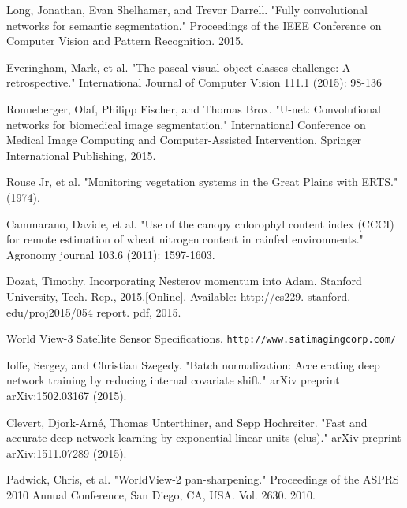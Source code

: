 \documentclass[10pt,twocolumn,letterpaper]{article}
\begin{document}
\begin{thebibliography}{10}
	
	 Long, Jonathan, Evan Shelhamer, and Trevor Darrell. "Fully convolutional networks for semantic segmentation." Proceedings of the IEEE Conference on Computer Vision and Pattern Recognition. 2015.
	
	 Everingham, Mark, et al. "The pascal visual object classes challenge: A retrospective." International Journal of Computer Vision 111.1 (2015): 98-136
	
	
	 Ronneberger, Olaf, Philipp Fischer, and Thomas Brox. "U-net: Convolutional networks for biomedical image segmentation." International Conference on Medical Image Computing and Computer-Assisted Intervention. Springer International Publishing, 2015.
	
	 Rouse Jr, et al. "Monitoring vegetation systems in the Great Plains with ERTS." (1974).
	
	 Cammarano, Davide, et al. "Use of the canopy chlorophyl content index (CCCI) for remote estimation of wheat nitrogen content in rainfed environments." Agronomy journal 103.6 (2011): 1597-1603.
		
	 Dozat, Timothy. Incorporating Nesterov momentum into Adam. Stanford University, Tech. Rep., 2015.[Online]. Available: http://cs229. stanford. edu/proj2015/054 report. pdf, 2015.
	
	 World View-3 Satellite Sensor Specifications.  \texttt{http://www.satimagingcorp.com/}
	
	 Ioffe, Sergey, and Christian Szegedy. "Batch normalization: Accelerating deep network training by reducing internal covariate shift." arXiv preprint arXiv:1502.03167 (2015).
	
	 Clevert, Djork-Arné, Thomas Unterthiner, and Sepp Hochreiter. "Fast and accurate deep network learning by exponential linear units (elus)." arXiv preprint arXiv:1511.07289 (2015).
	
	 Padwick, Chris, et al. "WorldView-2 pan-sharpening." Proceedings of the ASPRS 2010 Annual Conference, San Diego, CA, USA. Vol. 2630. 2010.
		
\end{thebibliography}
\end{document}
